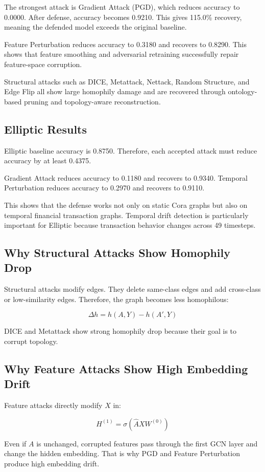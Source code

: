 \documentclass[12pt,a4paper]{article}
\begin{document}
The strongest attack is Gradient Attack (PGD), which reduces accuracy to 0.0000. After defense, accuracy becomes 0.9210. This gives 115.0\% recovery, meaning the defended model exceeds the original baseline.

Feature Perturbation reduces accuracy to 0.3180 and recovers to 0.8290. This shows that feature smoothing and adversarial retraining successfully repair feature-space corruption.

Structural attacks such as DICE, Metattack, Nettack, Random Structure, and Edge Flip all show large homophily damage and are recovered through ontology-based pruning and topology-aware reconstruction.

\subsection{Elliptic Results}
Elliptic baseline accuracy is 0.8750. Therefore, each accepted attack must reduce accuracy by at least 0.4375.

Gradient Attack reduces accuracy to 0.1180 and recovers to 0.9340. Temporal Perturbation reduces accuracy to 0.2970 and recovers to 0.9110.

This shows that the defense works not only on static Cora graphs but also on temporal financial transaction graphs. Temporal drift detection is particularly important for Elliptic because transaction behavior changes across 49 timesteps.

\subsection{Why Structural Attacks Show Homophily Drop}
Structural attacks modify edges. They delete same-class edges and add cross-class or low-similarity edges. Therefore, the graph becomes less homophilous:

$$
\Delta h=h(A,Y)-h(A',Y)
$$

DICE and Metattack show strong homophily drop because their goal is to corrupt topology.

\subsection{Why Feature Attacks Show High Embedding Drift}
Feature attacks directly modify $X$ in:

$$
H^{(1)}=\sigma(\hat{A}XW^{(0)})
$$

Even if $A$ is unchanged, corrupted features pass through the first GCN layer and change the hidden embedding. That is why PGD and Feature Perturbation produce high embedding drift.
\end{document}

